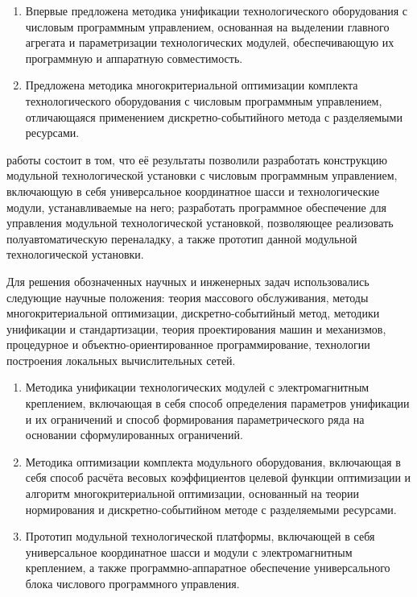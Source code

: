 {\novelty}
\begin{enumerate}[beginpenalty=10000] %
  \item Впервые предложена методика унификации технологического оборудования с числовым программным управлением, основанная на выделении главного агрегата и параметризации технологических модулей, обеспечивающую их программную и аппаратную совместимость.
  \item Предложена методика многокритериальной оптимизации комплекта технологического оборудования с числовым программным управлением, отличающаяся применением дискретно-событийного метода с разделяемыми ресурсами.
\end{enumerate}

{\influence} работы состоит в том, что её результаты позволили разработать конструкцию модульной технологической установки с числовым программным управлением, включающую в себя универсальное координатное шасси и технологические модули, устанавливаемые на него; разработать программное обеспечение для управления модульной технологической установкой, позволяющее реализовать полуавтоматическую переналадку, а также прототип данной модульной технологической установки.

{\methods} Для решения обозначенных научных и инженерных задач использовались следующие научные положения: теория массового обслуживания, методы многокритериальной оптимизации, дискретно-событийный метод, методики унификации и стандартизации, теория проектирования машин и механизмов, процедурное и объектно-­ориентированное программирование, технологии построения локальных вычислительных сетей.

{}
\begin{enumerate}[beginpenalty=10000] %
  \item Методика унификации технологических модулей с электромагнитным креплением, включающая в себя способ определения параметров унификации и их ограничений и способ формирования параметрического ряда на основании сформулированных ограничений.
  \item Методика оптимизации комплекта модульного оборудования, включающая в себя способ расчёта весовых коэффициентов целевой функции оптимизации и алгоритм многокритериальной оптимизации, основанный на теории нормирования и дискретно-событийном методе с разделяемыми ресурсами.
  \item Прототип модульной технологической платформы, включающей в себя универсальное координатное шасси и модули с электромагнитным креплением, а также программно-аппаратное обеспечение универсального блока числового программного управления.   
\end{enumerate}

